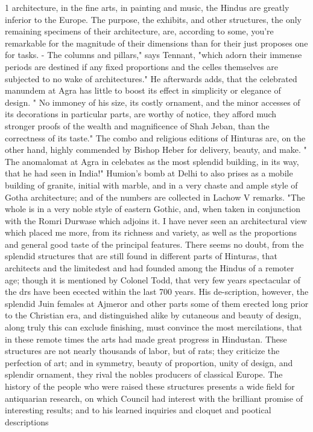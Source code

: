 \documentclass{article}
\begin{document}
1 architecture, in the fine arts, in painting and music, the Hindus are greatly inferior to the Europe. The purpose, the exhibits, and other structures, the only remaining specimens of their architecture, are, according to some, you’re remarkable for the magnitude of their dimensions than for their just proposes one for tasks. - The columns and pillars," says Tennant, "which adorn their immense periods are destined if any fixed proportions and the celles themselves are subjected to no wake of architectures." He afterwards adds, that the celebrated manundem at Agra has little to boost its effect in simplicity or elegance of design. " No immoney of his size, its costly ornament, and the minor accesses of its decorations in particular parts, are worthy of notice, they afford much stronger proofs of the wealth and magnificence of Shah Jeban, than the correctness of its taste." The combo and religious editions of Hinturas are, on the other hand, highly commended by Bishop Heber for delivery, beauty, and make. " The anomalomat at Agra in celebates as the most splendid building, in its way, that he had seen in India!" Humion's bomb at Delhi to also prises as a mobile building of granite, initial with marble, and in a very chaste and ample style of Gotha architecture; and of the numbers are collected in Lachow V remarks. "The whole is in a very noble style of eastern Gothic, and, when taken in conjunction with the Romri Durwase which adjoins it. I have never seen an architectural view which placed me more, from its richness and variety, as well as the proportions and general good taste of the principal features. There seems no doubt, from the splendid structures that are still found in different parts of Hinturas, that architects and the limitedest and had founded among the Hindus of a remoter age; though it is mentioned by Colonel Todd, that very few years spectacular of the drs have been ecected within the last 700 years. His de-scription, however, the splendid Juin females at Ajmeror and other parts some of them erected long prior to the Christian era, and distinguished alike by cutaneous and beauty of design, along truly this can exclude finishing, must convince the most mercilations, that in these remote times the arts had made great progress in Hindustan. These structures are not nearly thousands of labor, but of rats; they criticize the perfection of art; and in symmetry, beauty of proportion, unity of design, and splendir ornament, they rival the nobles producers of classical Europe. The history of the people who were raised these structures presents a wide field for antiquarian research, on which Council had interest with the brilliant promise of interesting results; and to his learned inquiries and cloquet and pootical descriptions
\end{document}
